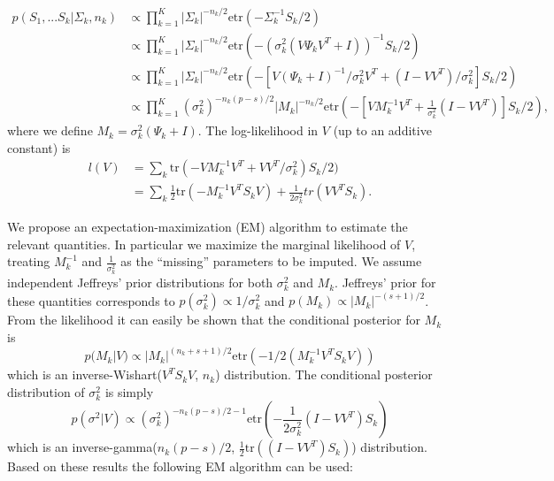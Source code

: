 \documentclass[12pt]{article}
\newcommand{\tr}{\text{tr}}
\newcommand{\etr}{\text{etr}}
\begin{document}
\begin{align}
\nonumber p(S_1, ... S_k | \Sigma_k,n_k) &\propto \prod_{k=1}^K |\Sigma_k|^{-n_k/2}\etr(-\Sigma_k^{-1}S_k/2)  \\
\nonumber &\propto \prod_{k=1}^K  |\Sigma_k|^{-n_k/2}\etr(-(\sigma_k^2(V\Psi_kV^T +
  I))^{-1}S_k/2) \\
\nonumber &\propto \prod_{k=1}^K  |\Sigma_k|^{-n_k/2}\etr(-\left[V(\Psi_k +
  I)^{-1}/\sigma_k^2 V^T + (I-VV^T)/\sigma^2_k\right]S_k/2)
  \\
&\propto \prod_{k=1}^K  (\sigma_k^2)^{-n_k(p-s)/2}|M_k|^{-n_k/2}\etr(-\left[VM_k^{-1}V^T + \frac{1}{\sigma^2_k} (I-VV^T)\right]S_k/2) ,
\end{align}
%
\noindent where we define $M_k = \sigma_k^2(\Psi_k + I)$.  The log-likelihood in
$V$ (up to an additive constant) is
%
\begin{align}
\nonumber l(V) &= \sum_k \tr\left(-VM_k^{-1}V^T +
       VV^T/\sigma^2_k\right)S_k/2)\\
&= \sum_k \frac{1}{2}\tr\left(-M_k^{-1}V^T S_kV\right) + \frac{1}{2\sigma_k^2}tr\left(VV^T S_k\right).
\end{align}


We propose an expectation-maximization (EM) algorithm to estimate the
relevant quantities.  In particular we maximize the marginal
likelihood of $V$, treating $M_k^{-1}$ and $\frac{1}{\sigma_k^2}$ as
the ``missing'' parameters to be imputed.  We assume independent
Jeffreys' prior distributions for both $\sigma_k^2$ and
$M_k$.  Jeffreys' prior for these quantities corresponds to
$p(\sigma_k^2) \propto 1/\sigma_k^2$ and
$p(M_k) \propto |M_k|^{-(s+1)/2}$.  From the likelihood it
can easily be shown that the conditional posterior for $M_k$ is
%
$$p(M_k | V) \propto |M_k|^{(n_k + s + 1)/2}\etr(-1/2(M_k^{-1}V^TS_kV)) $$
%
\noindent which is an inverse-Wishart($V^TS_kV$, $n_k$) distribution.  The
conditional posterior distribution of $\sigma_k^2$ is simply
%
$$p\left(\sigma^2 | V\right) \propto (\sigma_k^2)^{-n_k(p-s)/2-1}\etr\left(-\frac{1}{2\sigma^2_k} (I-VV^T)S_k\right)  $$
%
\noindent which is an inverse-gamma($n_k(p-s)/2$,
$\frac{1}{2}\text{tr}((I-VV^T)S_k)$) distribution.  Based on these
results the following EM algorithm can be used:
\end{document}
